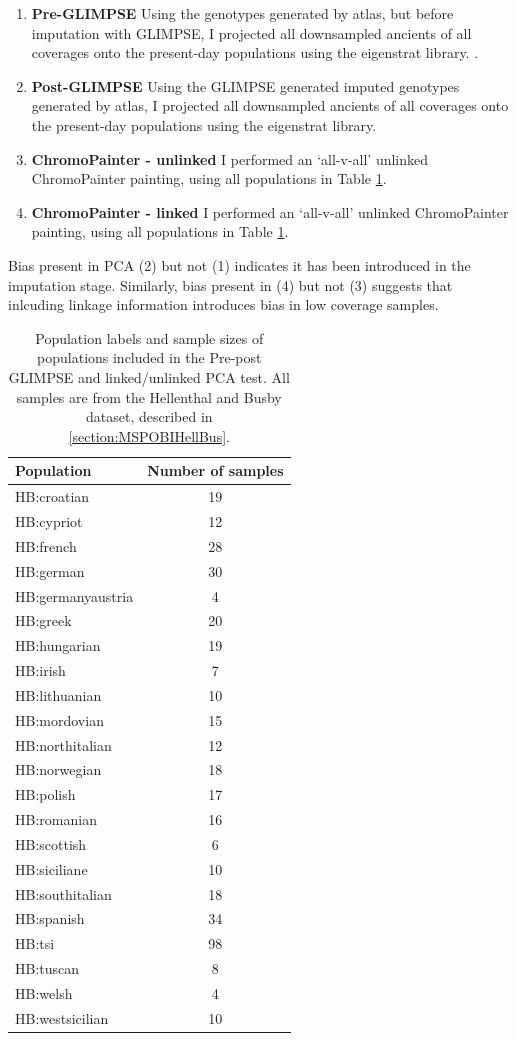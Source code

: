 \begin{enumerate}
\item \textbf{Pre-GLIMPSE} Using the genotypes generated by atlas, but before imputation with GLIMPSE, I projected all downsampled ancients of all coverages onto the present-day populations using the eigenstrat library. \cite{Price2006}.
\item \textbf{Post-GLIMPSE} Using the GLIMPSE generated imputed genotypes generated by atlas, I projected all downsampled ancients of all coverages onto the present-day populations using the eigenstrat library.
\item \textbf{ChromoPainter - unlinked} I performed an `all-v-all' unlinked ChromoPainter painting, using all populations in Table \ref{tab:HB_pops}. 
\item \textbf{ChromoPainter - linked} I performed an `all-v-all' unlinked ChromoPainter painting, using all populations in Table \ref{tab:HB_pops}.
\end{enumerate}

Bias present in PCA (2) but not (1) indicates it has been introduced in the imputation stage. Similarly, bias present in (4) but not (3) suggests that inlcuding linkage information introduces bias in low coverage samples. 


\begin{table}
\centering
\begin{tabular}[t]{lc}
\toprule
Population & Number of samples\\
\midrule
HB:croatian & 19\\
HB:cypriot & 12\\
HB:french & 28\\
HB:german & 30\\
HB:germanyaustria & 4\\
HB:greek & 20\\
HB:hungarian & 19\\
HB:irish & 7\\
HB:lithuanian & 10\\
HB:mordovian & 15\\
HB:northitalian & 12\\
HB:norwegian & 18\\
HB:polish & 17\\
HB:romanian & 16\\
HB:scottish & 6\\
HB:siciliane & 10\\
HB:southitalian & 18\\
HB:spanish & 34\\
HB:tsi & 98\\
HB:tuscan & 8\\
HB:welsh & 4\\
HB:westsicilian & 10\\
\bottomrule
\end{tabular}
\caption{Population labels and sample sizes of populations included in the Pre-post GLIMPSE and linked/unlinked PCA test. All samples are from the Hellenthal and Busby dataset, described in \ref{section:MSPOBIHellBus}.}
\label{tab:HB_pops}
\end{table}


